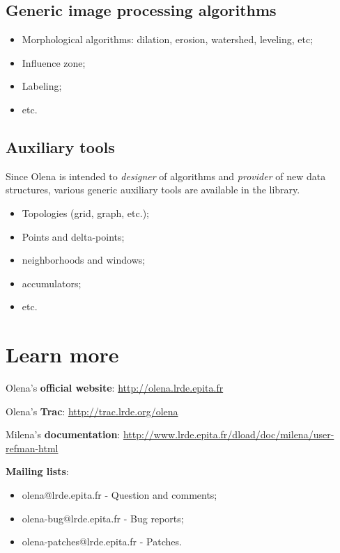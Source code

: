 \documentclass{article}
\begin{document}
\subsection{Generic image processing algorithms}

\begin{itemize}
  \item Morphological algorithms: dilation, erosion, watershed, leveling, etc;
  \item Influence zone;
  \item Labeling;
  \item etc.
\end{itemize}

\subsection{Auxiliary tools}

Since Olena is intended to \textit{designer} of algorithms and \textit{provider}
of new data structures, various generic auxiliary tools are available in the
library.

\begin{itemize}
  \item Topologies (grid, graph, etc.);
  \item Points and delta-points;
  \item neighborhoods and windows;
  \item accumulators;
  \item etc.
\end{itemize}



\section{Learn more}

Olena's \textbf{official website}: \url{http://olena.lrde.epita.fr}

Olena's \textbf{Trac}: \url{http://trac.lrde.org/olena}

Milena's \textbf{documentation}:
\url{http://www.lrde.epita.fr/dload/doc/milena/user-refman-html}

%
\medskip
%

\textbf{Mailing lists}:
\begin{itemize}
  \item olena@lrde.epita.fr - Question and comments;
  \item olena-bug@lrde.epita.fr - Bug reports;
  \item olena-patches@lrde.epita.fr - Patches.
\end {itemize}
\end{document}
